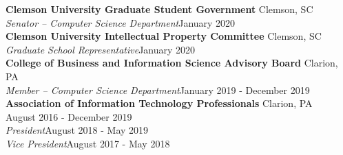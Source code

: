 \documentclass[letter]{article}
\begin{document}
                    \textbf{Clemson University Graduate Student Government} \hfill Clemson, SC\\
		    \textit{Senator -- Computer Science Department}\hfill{}January 2020\\
		\vspace{\interspace}
                    \textbf{Clemson University Intellectual Property Committee} \hfill Clemson, SC\\
		    \textit{Graduate School Representative}\hfill{}January 2020\\
		\vspace{\interspace}
                    \textbf{College of Business and Information Science Advisory Board} \hfill Clarion, PA\\
		    \textit{Member -- Computer Science Department}\hfill{}January 2019 - December 2019\\
		\vspace{\interspace}
                    \textbf{Association of Information Technology Professionals} \hfill Clarion, PA\\August 2016 - December 2019\\
		    	\textit{President}\hfill{}August 2018 - May 2019\\
		    	\textit{Vice President}\hfill{}August 2017 - May 2018\\
		\vspace{\interspace}
	    \vspace{-\interspace}




        


    
\end{document}
